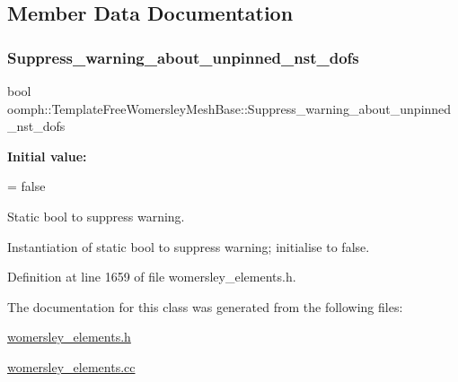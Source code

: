 \subsection{Member Data Documentation}
\mbox{\label{classoomph_1_1TemplateFreeWomersleyMeshBase_acafc84fe27a65ac15185aebc1a4d0974}} 
\subsubsection{\texorpdfstring{Suppress\+\_\+warning\+\_\+about\+\_\+unpinned\+\_\+nst\+\_\+dofs}{Suppress\_warning\_about\_unpinned\_nst\_dofs}}
{\footnotesize\ttfamily bool oomph\+::\+Template\+Free\+Womersley\+Mesh\+Base\+::\+Suppress\+\_\+warning\+\_\+about\+\_\+unpinned\+\_\+nst\+\_\+dofs\hspace{0.3cm}{\ttfamily [static]}}

{\bfseries Initial value\+:}
\begin{DoxyCode}
=
  \textcolor{keyword}{false}
\end{DoxyCode}


Static bool to suppress warning. 

Instantiation of static bool to suppress warning; initialise to false. 

Definition at line 1659 of file womersley\+\_\+elements.\+h.



The documentation for this class was generated from the following files\+:\begin{DoxyCompactItemize}
\item 
\hyperlink{womersley__elements_8h}{womersley\+\_\+elements.\+h}\item 
\hyperlink{womersley__elements_8cc}{womersley\+\_\+elements.\+cc}\end{DoxyCompactItemize}
